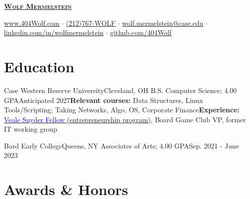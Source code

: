 \documentclass[letterpaper, 10pt]{article}
\begin{document}


\begin{center}
	\textbf{\Huge \scshape \href{https://404wolf.com}{Wolf Mermelstein}} \\ \vspace{4pt}

	\href{https://404wolf.com}{www.404Wolf.com}
	$\cdot$
	\small \href{tel:(+12127679653)}{(212)767-WOLF}
	$\cdot$
	\href{mailto:wolf.mermelstein@case.edu}{wolf.mermelstein@case.edu}
	$\cdot$
	\href{https://linkedin.com/in/wolfmermelstein}{linkedin.com/in/wolfmermelstein}
	$\cdot$
	\href{https://github.com/404wolf}{github.com/404Wolf}
\end{center}
\vspace{-16px}

\section{Education}
\resumeSubHeadingListStart
\resumeSubheadingCompact
{Case Western Reserve University}{Cleveland, OH}
{B.S. Computer Science; 4.00 GPA}{Anticipated 2027}{\textbf{Relevant courses:} Data Structures, Linux Tools/Scripting; Taking Networks, Algo, OS, Corporate Finance}{\textbf{Experience:} \href{https://case.edu/entrepreneurship/fellowships/veale-snyder-fellows-program}{\textcolor{blue}{Veale Snyder Fellow} (entrepreneurship program)}, Board Game Club VP, former IT working group}

\vspace{3.5pt}

\resumeSubheadingCompact
{Bard Early College}{Queens, NY}
{Associates of Arts;  4.00 GPA}{Sep. 2021 - June 2023}{}{}
\resumeSubHeadingListEnd

\section{Awards \& Honors}
\resumeSubHeadingListStart

\end{document}
